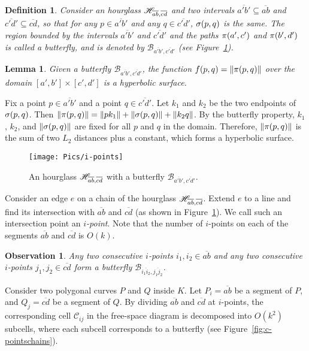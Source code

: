 \documentclass[12pt]{dalthesis}
\def\favoritefont{\bfseries \sffamily}
\def\QED{\ensuremath{{\Box}}}
\def\markatright#1{\leavevmode\unskip\nobreak\quad\hspace*{\fill}{#1}}
\newenvironment{proof}
	{\begin{trivlist}\item[\hskip\labelsep{\favoritefont Proof:}]}
	{\markatright{\QED}\end{trivlist}}
\newtheorem{lemma}[theorem]{Lemma}
\newtheorem{obs}{Observation}
\newtheorem{definition}{Definition}
\newcommand{\CB}{{\mathscr B}}
\newcommand{\CC}{{\mathscr C}}
\newcommand{\cell}[1]{{\CC_{#1}}}
\newcommand{\But}[2]{\CB_{\overline{#1},\overline{#2}}}
\newcommand{\Ov}[1]{\overline{#1}}
\begin{document}
\begin{definition}
Consider an hourglass ${\mathscr H}_{\overline{ab},\overline{cd}}$ and two intervals 
$\Ov{a' b'} \subseteq \Ov{ab} $ and $\Ov{c' d'} \subseteq \Ov{cd}$,
so that for any $p \in \Ov{a' b' }$ and any $q \in \Ov{c' d'}$, 
${\sigma}(p,q)$ is the same.
The region bounded by the intervals  $\Ov{a'b'}$ and  $\Ov{c'd'}$ 
and the paths $\pi(a',c')$ and $\pi(b', d')$ is called a butterfly,
and is denoted by $\But{a' b'}{c' d'}$ (see Figure~\ref{fig:but}).
\end{definition}




\begin{lemma} \label{lemma:ButFhyperbolic}
	Given a butterfly $\But{a' b'}{c' d'}$,
	the function  $f(p,q) = \| \pi(p,q) \|$ over the domain $[a',b'] \times [c',d']$ 
	is a hyperbolic surface. 
\end{lemma}

\begin{proof}
	Fix a point $p \in \Ov{a'b'}$ and a point $q \in \Ov{c'd'}$.
	Let $k_1$ and $k_2$ be the two endpoints of ${\sigma}(p,q)$.
	Then $\| \pi(p,q) \| = \|pk_1\| + \| {\sigma}(p,q) \| + \|k_2q\|$.
	By the butterfly property, $k_1$, $k_2$, and $\| {\sigma}(p,q) \|$ are fixed 
	for all $p$ and $q$ in the domain.
	Therefore,  $\| \pi(p,q) \|$ is the sum of two $L_2$ distances plus a constant,
	which forms a hyperbolic surface.
\end{proof}

\begin{figure}[h]
	\centering
	\texttt{[image: Pics/i-points]}
	\caption{ An hourglass ${\mathscr H}_{\overline{ab},\overline{cd}}$ with a butterfly $\But{a' b'}{c' d'}$.}
	\label{fig:but}
\end{figure}



Consider an edge $e$ on a chain of the hourglass ${\mathscr H}_{\overline{ab},\overline{cd}}$. 
Extend $e$ to a line and find its intersection with $\Ov{ab}$ and $\Ov{cd}$ (as shown in Figure~\ref{fig:but}). 
We call such an intersection point an \emph{$i$-point}. 
Note that the number of $i$-points on each of the segments $\Ov{ab}$ and $\Ov{cd}$ is $O(k)$.


\begin{obs} \label{obs:$i$-pointbutt}
	Any two consecutive $i$-points $i_1,i_2 \in \Ov{ab}$ 
	and any two consecutive $i$-points $j_1,j_2 \in \Ov{cd}$
form a butterfly $\But{i_1i_2}{j_1j_2}$.
\end{obs}


Consider two polygonal curves $P$ and $Q$ inside $K$.
Let $P_i = \Ov{ab}$ be a segment of $P$,
and $Q_j = \Ov{cd}$ be a segment of $Q$.
By dividing $\Ov{ab}$ and $\Ov{cd}$ at $i$-points,
the corresponding cell  $\cell{ij}$ in the free-space diagram 
is decomposed into $O(k^2)$ subcells,
where each subcell corresponds to a butterfly
(see Figure~\ref{fig:c-pointschains}).
\end{document}

